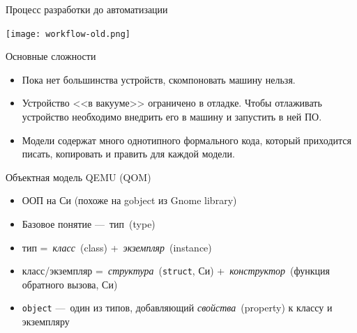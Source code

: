 \documentclass[unicode,hyperref={unicode=true}]{beamer}
\theoremstyle{definition}
\theoremstyle{plain}
\begin{document}
\begin{frame}{Процесс разработки до автоматизации}
\begin{center}
\texttt{[image: workflow-old.png]}
\end{center}
\end{frame}



\begin{frame}{Основные сложности}
\begin{itemize}
\item Пока нет большинства устройств, скомпоновать машину нельзя.
\item Устройство <<в вакууме>> ограничено в отладке. Чтобы отлаживать
устройство необходимо внедрить его в машину и запустить в ней ПО.
\item Модели содержат много однотипного формального кода, который приходится
писать, копировать и править для каждой модели.
\end{itemize}
\end{frame}



\begin{frame}{Объектная модель QEMU (QOM)}
\begin{minipage}{0.49\textwidth}
\hfill
\end{minipage}
\hfill
\begin{minipage}{0.49\textwidth}
\begin{itemize}
\item ООП на Си (похоже на gobject из Gnome library)
\item Базовое понятие ---~тип~(type)
\item тип =~\textit{класс}~(class) +~\textit{экземпляр}~(instance)
\item класс/экземпляр =~\textit{структура}~(\texttt{struct}, Си)
+~\textit{конструктор}~(функция обратного вызова, Си)
\item \texttt{object} ---~один из типов, добавляющий
\textit{свойства}~(property) к классу и экземпляру
\end{itemize}
\end{minipage}
\end{frame}
\end{document}
